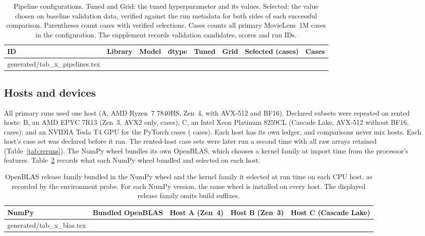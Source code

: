 \documentclass[11pt,a4paper]{article}
\makeatletter
\newcommand{\tablebody}[1]{\@@input generated/#1.tex }
\makeatother
\begin{document}
\begin{table}[htbp]
  \centering
  \caption{Pipeline configurations. Tuned and Grid: the tuned hyperparameter
    and its values. Selected: the value chosen on baseline validation data,
    verified against the run metadata for both sides of each successful
    comparison. Parentheses count cases with verified selections. Cases
    counts all primary MovieLens~1M cases in the configuration. The
    supplement records validation candidates, scores and run IDs.}
  \label{tab:pipelines}
  \scriptsize\setlength{\tabcolsep}{2pt}
  \begin{tabular}{@{}lllllllr@{}}
    \toprule
    ID & Library & Model & dtype & Tuned & Grid & Selected (cases) & Cases \\
    \midrule
    \tablebody{tab_x_pipelines}
    \bottomrule
  \end{tabular}
\end{table}

\subsection{Hosts and devices}
All primary runs used one host (A, AMD Ryzen~7 7840HS, Zen~4, with AVX-512 and
BF16). Declared subsets were repeated on rented hosts: B, an AMD EPYC 7R13
(Zen~3, AVX2 only, \nHostB{} cases); C, an Intel Xeon Platinum 8259CL
(Cascade Lake, AVX-512 without BF16, \nHostC{} cases); and an NVIDIA Tesla T4
GPU for the PyTorch cases (\nHostGpu{} cases). Each host has its own ledger,
and comparisons never mix hosts. Each host's case set was declared before
it ran. The rented-host case sets were later run a second time with all raw
arrays retained (Table~\ref{tab:reruns}). The NumPy wheel bundles its own OpenBLAS, which chooses a kernel family
at import time from the processor's features. Table~\ref{tab:blas} records what
each NumPy wheel bundled and selected on each host.

\begin{table}[htbp]
  \centering\small
  \caption{OpenBLAS release family bundled in the NumPy wheel and the kernel family it
    selected at run time on each CPU host, as recorded by the environment
    probe. For each NumPy version, the same wheel is installed on every host.
    The displayed release family omits build suffixes.}
  \label{tab:blas}
  \begin{tabular}{@{}llccc@{}}
    \toprule
    NumPy & Bundled OpenBLAS & Host A (Zen~4) & Host B (Zen~3) & Host C (Cascade Lake) \\
    \midrule
    \tablebody{tab_x_blas}
    \bottomrule
  \end{tabular}
\end{table}
\end{document}
